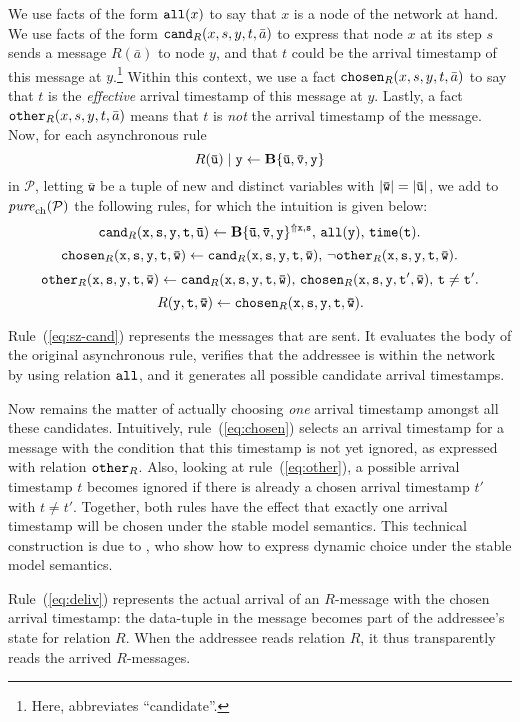 \documentclass{tlp}
\newcommand{\ded}{\mathcal{P}}
\newcommand{\var}[1]{\mathtt{#1}}
\newcommand{\tvar}[1]{\mathtt{\bar{#1}}}
\newcommand{\addlt}[3]{#1^{\Uparrow#2,#3}}
\newcommand{\reltime}{\pred{time}}
\newcommand{\relall}{\pred{all}}
\newcommand{\chosen}{\pred{chosen}}
\newcommand{\other}{\pred{other}}
\newcommand{\cand}{\pred{cand}}
\newcommand{\purech}[1]{\fname{pure}_{\mathrm{ch}}(#1)}
\newcommand{\cronrulecandidate}[1]{\cand_{R}(\var x,\var s,\var y,\var t,\tvar u)\gets\addlt{\simplebody{\tvar u,\tvar v,\var y}}{\var x}{\var s},\,\relall(\var y),\,\reltime(\var t)#1 }
\begin{document}
We use facts of the form $\relall(x)$ to say that $x$ is a node
of the network at hand. We use facts of the form $\cand_{R}(x,s,y,t,\bar{a})$
to express that node $x$ at its step $s$ sends a message $R(\bar{a})$
to node $y$, and that $t$ could be the arrival timestamp of this
message at $y$.\footnote{Here, \sq{$\cand$} abbreviates ``candidate''.} Within this context, we use a fact $\chosen_{R}(x,s,y,t,\bar{a})$
to say that $t$ is the \emph{effective} arrival timestamp of this
message at $y$. Lastly, a fact $\other_{R}(x,s,y,t,\bar{a})$ means
that $t$ is \emph{not} the arrival timestamp of the message. Now,
for each asynchronous rule 
\[
R(\tvar u)\sugas{\var y}\gets\simplebody{\tvar u,\tvar v,\var y}
\]
in $\ded$, letting $\tvar w$ be a tuple of new and distinct variables
with $\len{\tvar w}=\len{\tvar u}$, we add to $\purech{\ded}$ the
following rules, for which the intuition is given below:
\begin{equation}
\cronrulecandidate .\label{eq:sz-cand}
\end{equation}
\begin{equation}
\rulechosen .\label{eq:chosen}
\end{equation}
\begin{equation}
\ruleother .\label{eq:other}
\end{equation}
\begin{equation}
\ruledeliv .\label{eq:deliv}
\end{equation}


Rule~(\ref{eq:sz-cand}) represents the messages that are sent.
It evaluates the body of the original asynchronous rule, verifies
that the addressee is within the network by using relation $\relall$,
and it generates all possible candidate arrival timestamps.

Now remains the matter of actually choosing \emph{one} arrival timestamp
amongst all these candidates. Intuitively, rule~(\ref{eq:chosen})
selects an arrival timestamp for a message with the condition that
this timestamp is not yet ignored, as expressed with relation $\other_{R}$.
Also, looking at rule~(\ref{eq:other}), a possible arrival timestamp
$t$ becomes ignored if there is already a chosen arrival timestamp
$t'$ with $t\neq t'$. Together, both rules have the effect that
exactly one arrival timestamp will be chosen under the stable model
semantics. This technical construction is due to ,
who show how to express dynamic choice under the stable model semantics.



Rule~(\ref{eq:deliv}) represents the actual arrival of an $R$-message
with the chosen arrival timestamp: the data-tuple in the message becomes
part of the addressee's state for relation $R$. When the addressee
reads relation $R$, it thus transparently reads the arrived $R$-messages.
\end{document}
